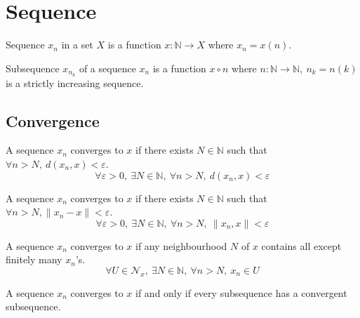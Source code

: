 \section{Sequence}
\begin{definition}
	Sequence $x_n$ in a set $X$ is a function $x : \mathbb{N} \to X$ where $x_n = x(n)$.
\end{definition}

\begin{definition}
	Subsequence $x_{n_k}$ of a sequence $x_n$ is a function $x \circ n$ where $n : \mathbb{N}\to \mathbb{N},\ n_k = n(k)$ is a strictly increasing sequence.
\end{definition}

\subsection{Convergence}
\begin{definition}[metric]
	A sequence $x_n$ converges to $x$ if there exists $N \in \mathbb{N}$ such that $\forall n > N,\ d(x_n,x) < \varepsilon$.
\begin{equation}
	\forall \varepsilon > 0,\ \exists N \in \mathbb{N},\ \forall n > N,\ d(x_n,x) < \varepsilon
\end{equation}
\end{definition}

\begin{definition}[norm]
	A sequence $x_n$ converges to $x$ if there exists $N \in \mathbb{N}$ such that $\forall n > N, \|x_n-x\| < \varepsilon$.
\begin{equation}
	\forall \varepsilon > 0,\ \exists N \in \mathbb{N},\ \forall n > N,\ \|x_n,x\| < \varepsilon
\end{equation}
\end{definition}

\begin{definition}[neighbourhood]
	A sequence $x_n$ converges to $x$ if any neighbourhood $N$ of $x$ contains all except finitely many $x_n$'s.
\begin{equation}
	\forall U \in \mathcal{N}_x,\ \exists N \in \mathbb{N},\ \forall n > N,\ x_n \in U
\end{equation}
\end{definition}

\begin{remark}[subsequence]
	A sequence $x_n$ converges to $x$ if and only if every subsequence has a convergent subsequence.
\end{remark}


